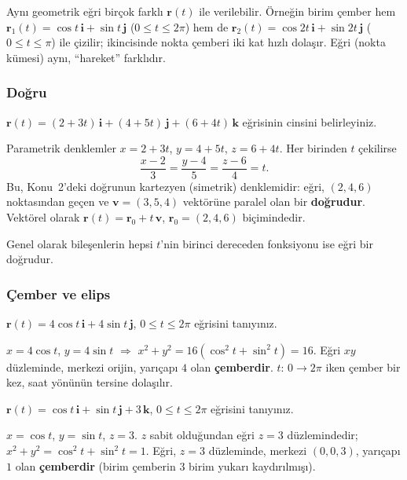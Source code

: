 \begin{bilgi}
Aynı geometrik eğri birçok farklı $\mathbf r(t)$ ile verilebilir. Örneğin birim çember hem
$\mathbf r_1(t)=\cos t\,\mathbf i+\sin t\,\mathbf j$ ($0\le t\le2\pi$) hem de $\mathbf r_2(t)=\cos2t\,\mathbf i+\sin2t\,\mathbf j$
($0\le t\le\pi$) ile çizilir; ikincisinde nokta çemberi iki kat hızlı dolaşır. Eğri (nokta kümesi) aynı, ``hareket'' farklıdır.
\end{bilgi}

\subsubsection{Doğru}

\begin{soru}
$\mathbf r(t)=(2+3t)\,\mathbf i+(4+5t)\,\mathbf j+(6+4t)\,\mathbf k$ eğrisinin cinsini belirleyiniz.
\end{soru}
\begin{cevap}
Parametrik denklemler $x=2+3t$, $y=4+5t$, $z=6+4t$. Her birinden $t$ çekilirse
\[ \frac{x-2}{3}=\frac{y-4}{5}=\frac{z-6}{4}=t . \]
Bu, Konu~2'deki doğrunun kartezyen (simetrik) denklemidir: eğri, $(2,4,6)$ noktasından geçen ve $\mathbf v=(3,5,4)$
vektörüne paralel olan bir \textbf{doğrudur}. Vektörel olarak $\mathbf r(t)=\mathbf r_0+t\,\mathbf v$,
$\mathbf r_0=(2,4,6)$ biçimindedir.
\end{cevap}

Genel olarak bileşenlerin hepsi $t$'nin birinci dereceden fonksiyonu ise eğri bir doğrudur.

\subsubsection{Çember ve elips}

\begin{soru}
$\mathbf r(t)=4\cos t\,\mathbf i+4\sin t\,\mathbf j$, $0\le t\le2\pi$ eğrisini tanıyınız.
\end{soru}
\begin{cevap}
$x=4\cos t$, $y=4\sin t$ $\Rightarrow$ $x^2+y^2=16(\cos^2t+\sin^2t)=16$. Eğri $xy$ düzleminde, merkezi orijin, yarıçapı $4$
olan \textbf{çemberdir}. $t$: $0\to2\pi$ iken çember bir kez, saat yönünün tersine dolaşılır.
\end{cevap}

\begin{soru}
$\mathbf r(t)=\cos t\,\mathbf i+\sin t\,\mathbf j+3\,\mathbf k$, $0\le t\le2\pi$ eğrisini tanıyınız.
\end{soru}
\begin{cevap}
$x=\cos t$, $y=\sin t$, $z=3$. $z$ sabit olduğundan eğri $z=3$ düzlemindedir; $x^2+y^2=\cos^2t+\sin^2t=1$.
Eğri, $z=3$ düzleminde, merkezi $(0,0,3)$, yarıçapı $1$ olan \textbf{çemberdir} (birim çemberin $3$ birim yukarı kaydırılmışı).
\end{cevap}


